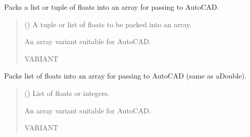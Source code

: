 \documentclass[a4paper,10pt,english]{sphinxmanual}
\begin{document}

\begin{fulllineitems}
\label{\detokenize{API:pyacad.Types.aDouble}}
\pysigstartsignatures
{}
\pysigstopsignatures
\sphinxAtStartPar
Packs a list or tuple of floats into an array for passing to AutoCAD.
\begin{quote}\begin{description}
\sphinxAtStartPar
{} (\sphinxstyleliteralemphasis{\sphinxupquote{, }}) \textendash{} A tuple or list of floats to be packed into an array.

\sphinxAtStartPar
An array variant suitable for AutoCAD.

\sphinxAtStartPar
VARIANT

\end{description}\end{quote}

\end{fulllineitems}


\begin{fulllineitems}
\label{\detokenize{API:pyacad.Types.aInt}}
\pysigstartsignatures
{}
\pysigstopsignatures
\sphinxAtStartPar
Packs list of floats into an array for passing to AutoCAD (same as aDouble).
\begin{quote}\begin{description}
\sphinxAtStartPar
{} (\sphinxstyleliteralemphasis{\sphinxupquote{, }}) \textendash{} List of floats or integers.

\sphinxAtStartPar
An array variant suitable for AutoCAD.

\sphinxAtStartPar
VARIANT

\end{description}\end{quote}

\end{fulllineitems}
\end{document}
